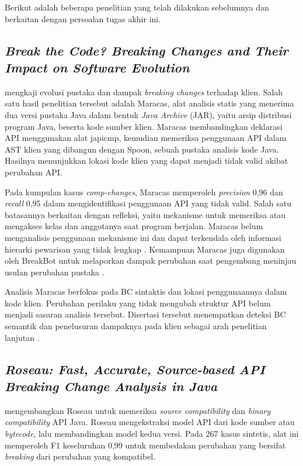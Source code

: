 Berikut adalah beberapa penelitian yang telah dilakukan sebelumnya dan berkaitan dengan persoalan tugas akhir ini.

\subsection{\textit{Break the Code? Breaking Changes and Their Impact on Software Evolution}}
\label{subsec:ochoa}

\textcite{Ochoa2023} mengkaji evolusi pustaka dan dampak \textit{breaking changes} terhadap klien. Salah satu hasil penelitian tersebut adalah Maracas, alat analisis statis yang menerima dua versi pustaka Java dalam bentuk \textit{Java Archive} (JAR), yaitu arsip distribusi program Java, beserta kode sumber klien. Maracas membandingkan deklarasi API menggunakan alat japicmp, kemudian memeriksa penggunaan API dalam AST klien yang dibangun dengan Spoon, sebuah pustaka analisis kode Java. Hasilnya menunjukkan lokasi kode klien yang dapat menjadi tidak valid akibat perubahan API\@.

Pada kumpulan kasus \textit{comp-changes}, Maracas memperoleh \textit{precision} 0,96 dan \textit{recall} 0,95 dalam mengidentifikasi penggunaan API yang tidak valid. Salah satu batasannya berkaitan dengan refleksi, yaitu mekanisme untuk memeriksa atau mengakses kelas dan anggotanya saat program berjalan. Maracas belum menganalisis penggunaan mekanisme ini dan dapat terkendala oleh informasi hierarki pewarisan yang tidak lengkap \parencite[hlm.~192--194]{Ochoa2023}. Kemampuan Maracas juga digunakan oleh BreakBot untuk melaporkan dampak perubahan saat pengembang meninjau usulan perubahan pustaka \parencite{Ochoa2022BreakBot}.

Analisis Maracas berfokus pada BC sintaktis dan lokasi penggunaannya dalam kode klien. Perubahan perilaku yang tidak mengubah struktur API belum menjadi sasaran analisis tersebut. Disertasi tersebut menempatkan deteksi BC semantik dan penelusuran dampaknya pada klien sebagai arah penelitian lanjutan \parencite[hlm.~208]{Ochoa2023}.

\subsection{\textit{Roseau: Fast, Accurate, Source-based API Breaking Change Analysis in Java}}
\label{subsec:roseau}

\textcite{Latappy2025Roseau} mengembangkan Roseau untuk memeriksa \textit{source compatibility} dan \textit{binary compatibility} API Java. Roseau mengekstraksi model API dari kode sumber atau \textit{bytecode}, lalu membandingkan model kedua versi. Pada 267 kasus sintetis, alat ini memperoleh F1 keseluruhan 0,99 untuk membedakan perubahan yang bersifat \textit{breaking} dari perubahan yang kompatibel.

